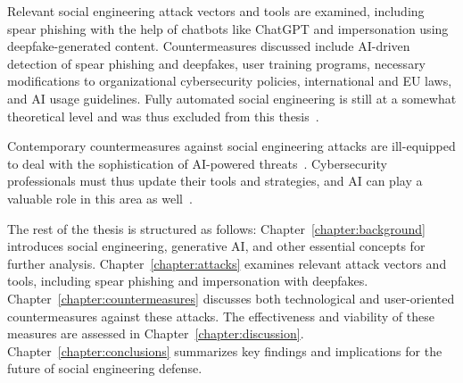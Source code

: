 %
%
Relevant social engineering attack vectors and tools are examined, including spear phishing with the help of chatbots like ChatGPT and impersonation using deepfake-generated content. Countermeasures discussed include AI-driven detection of spear phishing and deepfakes, user training programs, necessary modifications to organizational cybersecurity policies, international and EU laws, and AI usage guidelines. Fully automated social engineering is still at a somewhat theoretical level and was thus excluded from this thesis~\citep{hatfield_SE_Evolution_Concept_2018}.



%
%
Contemporary countermeasures against social engineering attacks are ill-equipped to deal with the sophistication of AI-powered threats~\citep{blauth_AI_Crime_Overview_Malicious_Use_Abuse_2022, king_AI_Crime_Interdisciplinary_Analysis_2019}. Cybersecurity professionals must thus update their tools and strategies, and AI can play a valuable role in this area as well~\citep{fakhouri_AI_Driven_Solutions_SE_Attacks_2024, tsinganos_Towards_Automated_Recognition_Chat_SE_Enterprise_2018}.





%
%
The rest of the thesis is structured as follows: Chapter~\ref{chapter:background} introduces social engineering, generative AI, and other essential concepts for further analysis. Chapter~\ref{chapter:attacks} examines relevant attack vectors and tools, including spear phishing and impersonation with deepfakes. Chapter~\ref{chapter:countermeasures} discusses both technological and user-oriented countermeasures against these attacks. The effectiveness and viability of these measures are assessed in Chapter~\ref{chapter:discussion}. Chapter~\ref{chapter:conclusions} summarizes key findings and implications for the future of social engineering defense.
